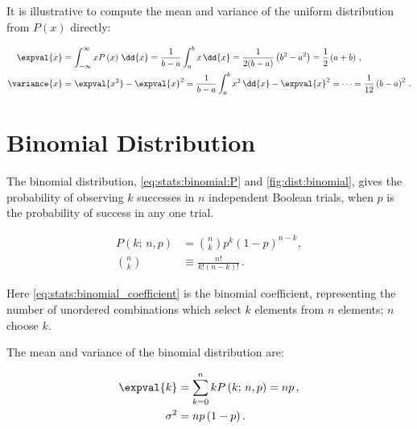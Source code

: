 It is illustrative to compute the mean and variance of the uniform distribution from $P(x)$ directly:

\begin{subequations}\label{eq:stats:uniform:mean_variance}
\begin{align}
\expval{x} &= \int_{-\infty}^{\infty} x P\left(x\right) \, \dd{x} = \frac{1}{b-a} \int_{a}^{b} x \, \dd{x} = \frac{1}{2(b-a)}\left(b^{2} - a^{2}\right) = \frac{1}{2}\left(a + b\right)\,, \label{eq:stats:uniform:mean_variance:mean} \\
\variance{x} &= \expval{x^{2}} - \expval{x}^{2} = \frac{1}{b-a} \int_{a}^{b} x^{2} \, \dd{x} - \expval{x}^{2} = \cdots = \frac{1}{12}\left(b-a\right)^{2}\,. \label{eq:stats:uniform:mean_variance:variance}
\end{align}
\end{subequations}

\section{Binomial Distribution}
\label{stats:binomial}

The binomial distribution, \cref{eq:stats:binomial:P} and \cref{fig:dist:binomial},
gives the probability of observing $k$ successes in $n$ independent Boolean trials,
when $p$ is the probability of success in any one trial.

\begin{subequations}\label{eq:stats:binomial}
\begin{align}
P\left(k;\,n,p\right) &= {n \choose k}p^{k} \left(1-p\right)^{n-k}, \label{eq:stats:binomial:P} \\
{n \choose k} &\equiv \frac{n!}{k!\left(n-k\right)!}\,. \label{eq:stats:binomial_coefficient}
\end{align}
\end{subequations}

\noindent Here \cref{eq:stats:binomial_coefficient} is the binomial coefficient,
representing the number of unordered combinations
which select $k$ elements from $n$ elements; $n$ choose $k$.

The mean and variance of the binomial distribution are:

\begin{subequations}\label{eq:stats:binomial:mean_variance}
\begin{align}
\expval{k} &= \sum_{k=0}^{n} k P\left(k;\,n,p\right) = n p\,, \label{eq:stats:binomial:mean} \\
\sigma^{2} &= n p\left(1-p\right). \label{eq:stats:binomial:variance}
\end{align}
\end{subequations}

